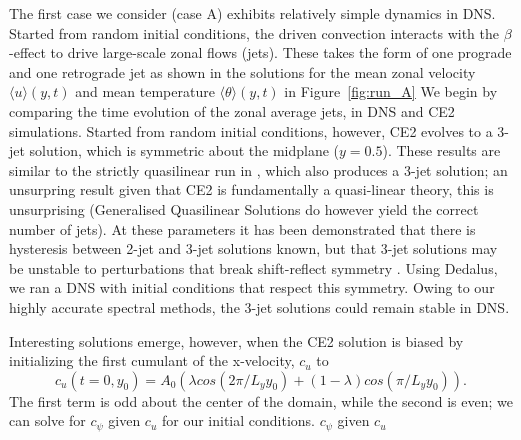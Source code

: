 \documentclass{jfm}
\newcommand{\cu}{c_u}
\begin{document}
The first case we consider (case A) exhibits relatively simple dynamics in DNS. Started from random initial conditions, the driven convection interacts with the $\beta$-effect to drive large-scale zonal flows (jets). These takes the form of one prograde and one retrograde jet as shown in the solutions for the mean zonal velocity $\langle u \rangle(y, t)$ and mean temperature $\langle \theta\rangle(y,t) $ in Figure~\ref{fig:run_A} 
We begin by comparing the time evolution of the zonal average jets,  in DNS and CE2 simulations.
Started from random initial conditions, however, CE2 evolves to a 3-jet solution, which is symmetric about the midplane ($y=0.5$). These results are similar to the strictly quasilinear run in \citet{2018RSPSA.47480422T}, which also produces a 3-jet solution; an unsurpring result given that 
 CE2 is fundamentally a quasi-linear theory, this is unsurprising (Generalised Quasilinear Solutions do however yield the correct number of jets). At these parameters it has been demonstrated that  there is hysteresis between 2-jet and 3-jet solutions known, but that 3-jet solutions may be unstable to perturbations that break shift-reflect symmetry \citep{bh1993}. Using Dedalus, we ran a DNS with initial conditions that respect this symmetry. Owing to our highly accurate spectral methods, the 3-jet solutions could remain stable in DNS.

Interesting solutions emerge, however, when the CE2 solution is biased 
 by initializing the first cumulant of the x-velocity, $\cu$ to
\begin{equation}
  \label{eq:bias}
  \cu(t=0, y_0) = A_0 \left( \lambda cos(2\pi/L_y y_0) + (1-\lambda) cos (\pi/L_y y_0)\right).
\end{equation}
The first term is odd about the center of the domain, while the second is even; we can solve for $c_\psi$ given $\cu$ for our initial conditions.
$c_\psi$ given $\cu$
\end{document}
